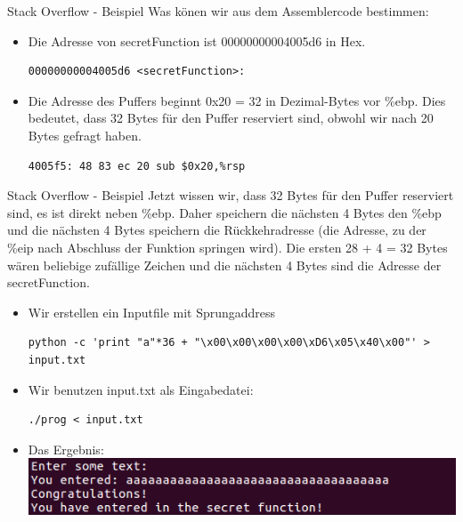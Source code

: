 \documentclass[10pt]{beamer}
\begin{document}
\begin{frame}[fragile]{Stack Overflow - Beispiel}
  Was k\"onen wir aus dem Assemblercode bestimmen:

  \begin{itemize}
    \item Die Adresse von secretFunction ist 00000000004005d6 in Hex. 
    \begin{lstlisting}[style=C2Style]
      00000000004005d6 <secretFunction>:
    \end{lstlisting}
    \item Die Adresse des Puffers beginnt 0x20 = 32 in Dezimal-Bytes vor \%ebp. Dies bedeutet, dass 32 Bytes für den Puffer reserviert sind, obwohl wir nach 20 Bytes gefragt haben.
    \begin{lstlisting}[style=C2Style]
      4005f5: 48 83 ec 20 sub $0x20,%rsp
    \end{lstlisting}
  \end{itemize}

\end{frame}

\begin{frame}[fragile]{Stack Overflow - Beispiel}
  Jetzt wissen wir, dass 32 Bytes für den Puffer reserviert sind, es ist direkt neben \%ebp. Daher speichern die nächsten 4 Bytes den \%ebp und die nächsten 4 Bytes speichern die Rückkehradresse (die Adresse, zu der \%eip nach Abschluss der Funktion springen wird). Die ersten 28 + 4 = 32 Bytes wären beliebige zufällige Zeichen und die nächsten 4 Bytes sind die Adresse der secretFunction.

  \begin{itemize}
    \item Wir erstellen ein Inputfile mit Sprungaddress
    \begin{lstlisting}[style=C2Style]
      python -c 'print "a"*36 + "\x00\x00\x00\x00\xD6\x05\x40\x00"' > input.txt
    \end{lstlisting}
    \item Wir benutzen input.txt als Eingabedatei:
    \begin{lstlisting}[style=C2Style]
      ./prog < input.txt
    \end{lstlisting}
    \item Das Ergebnis:
    \includegraphics[width=\textwidth]{buffer-2.png}
  \end{itemize}

\end{frame}
\end{document}
